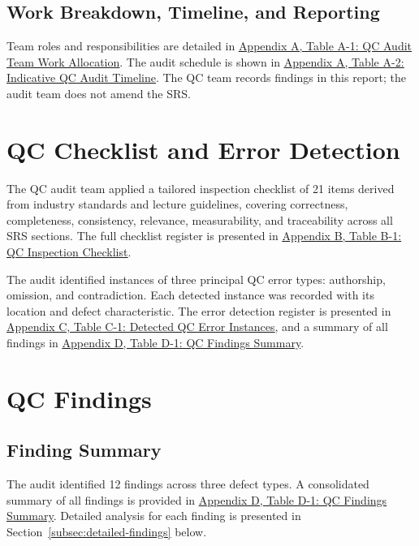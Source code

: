 \documentclass[11pt,a4paper]{article}
\let\origref\ref
\renewcommand{\ref}[1]{\uline{\origref{#1}}}
\let\orighyperref\hyperref
\renewcommand{\hyperref}[2][]{\orighyperref[#1]{\uline{#2}}}
\begin{document}
\subsection{Work Breakdown, Timeline, and Reporting}
Team roles and responsibilities are detailed in \hyperref[tab:qc-wbs]{Appendix A, Table A-1: QC Audit Team Work Allocation}. The audit schedule is shown in \hyperref[tab:qc-timeline]{Appendix A, Table A-2: Indicative QC Audit Timeline}. The QC team records findings in this report; the audit team does not amend the SRS.

\section{QC Checklist and Error Detection}

The QC audit team applied a tailored inspection checklist of 21 items derived from industry standards and lecture guidelines, covering correctness, completeness, consistency, relevance, measurability, and traceability across all SRS sections. The full checklist register is presented in \hyperref[tab:qc-checklist]{Appendix B, Table B-1: QC Inspection Checklist}.

The audit identified instances of three principal QC error types: authorship, omission, and contradiction. Each detected instance was recorded with its location and defect characteristic. The error detection register is presented in \hyperref[tab:qc-error-detection]{Appendix C, Table C-1: Detected QC Error Instances}, and a summary of all findings in \hyperref[tab:qc-findings-summary]{Appendix D, Table D-1: QC Findings Summary}.

\section{QC Findings}
\label{sec:qc-findings}

\subsection{Finding Summary}

The audit identified 12 findings across three defect types. A consolidated summary of all findings is provided in \hyperref[tab:qc-findings-summary]{Appendix D, Table D-1: QC Findings Summary}. Detailed analysis for each finding is presented in Section~\ref{subsec:detailed-findings} below.
\end{document}
